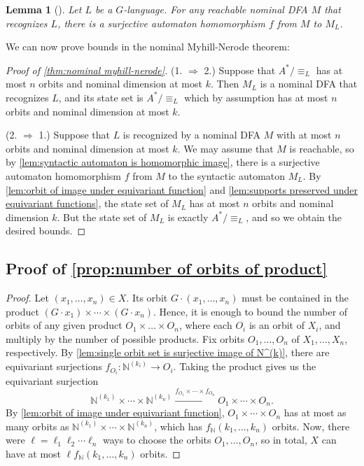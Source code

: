 \documentclass[11pt,a4paper]{amsart}
\newtheorem{lemma}{Lemma}
\theoremstyle{definition}
\newcommand{\bb}{\mathbb}
\begin{document}
\begin{lemma}[{\cite[Lemma 3.7]{bojanczyk-klin-lasota:automata-theory-in-nominal-sets}}] \label{lem:syntactic automaton is homomorphic image}
    Let $L$ be a $G$-language.
    For any reachable nominal DFA $M$ that recognizes $L$, there is a surjective automaton homomorphism $f$ from $M$ to $M_L$.
\end{lemma}

We can now prove bounds in the nominal Myhill-Nerode theorem:

\begin{proof}[Proof of \autoref{thm:nominal myhill-nerode}]
    (1. $\Rightarrow$ 2.) Suppose that $A^* / \equiv_L$ has at most $n$ orbits and nominal dimension at most $k$.
    Then $M_L$ is a nominal DFA that recognizes $L$, and its state set is $A^* / \equiv_L$ which by assumption has at most $n$ orbits and nominal dimension at most $k$.

    (2. $\Rightarrow$ 1.) Suppose that $L$ is recognized by a nominal DFA $M$ with at most $n$ orbits and nominal dimension at most $k$. 
    We may assume that $M$ is reachable, so by \autoref{lem:syntactic automaton is homomorphic image}, there is a surjective automaton homomorphism $f$ from $M$ to the syntactic automaton $M_L$. 
    By \autoref{lem:orbit of image under equivariant function} and \autoref{lem:supports preserved under equivariant functions}, the state set of $M_L$ has at most $n$ orbits and nominal dimension $k$. 
    But the state set of $M_L$ is exactly $A^* / \equiv_L$, and so we obtain the desired bounds.
\end{proof}



\subsection{Proof of \autoref{prop:number of orbits of product}} \label{appendix:proof of number of orbits of product}

\begin{proof}
    Let $(x_1, \ldots, x_n) \in X$.
    Its orbit $G \cdot (x_1, \ldots, x_n)$ must be contained in the product $(G \cdot x_1) \times \cdots \times (G \cdot x_n)$.
    Hence, it is enough to bound the number of orbits of any given product $O_1 \times \ldots \times O_n$, where each $O_i$ is an orbit of $X_i$, and multiply by the number of possible products.
    Fix orbits $O_1, \ldots, O_n$ of $X_1, \ldots, X_n$, respectively. 
    By \autoref{lem:single orbit set is surjective image of N^(k)}, there are equivariant surjections $f_{O_i} : \bb N^{(k_i)} \to O_i$. 
    Taking the product gives us the equivariant surjection
    \[
        \bb N^{(k_1)} \times \cdots \times \bb N^{(k_n)} \xrightarrow{f_{O_1} \times \cdots \times f_{O_n}} O_1 \times \cdots \times O_n.
    \]
    By \autoref{lem:orbit of image under equivariant function}, $O_1 \times \cdots \times O_n$ has at most as many orbits as $\bb N^{(k_1)} \times \cdots \times \bb N^{(k_n)}$, which has $f_{\bb N}(k_1, \ldots, k_n)$ orbits.
    Now, there were $\ell = \ell_1 \ell_2 \cdots \ell_n$ ways to choose the orbits $O_1, \ldots, O_n$, so in total, $X$ can have at most $\ell f_{\bb N}(k_1, \ldots, k_n)$ orbits.
\end{proof}
\end{document}
